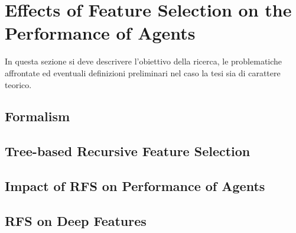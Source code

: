 \chapter{Effects of Feature Selection on the Performance of Agents}
\label{ch3_setup}
\thispagestyle{empty}

\vspace{0.5cm}

\noindent In questa sezione si deve descrivere l'obiettivo della ricerca, le 
problematiche affrontate ed eventuali definizioni preliminari nel caso la tesi 
sia di carattere teorico.

\section{Formalism}

\section{Tree-based Recursive Feature Selection}

\section{Impact of RFS on Performance of Agents}

\section{RFS on Deep Features}